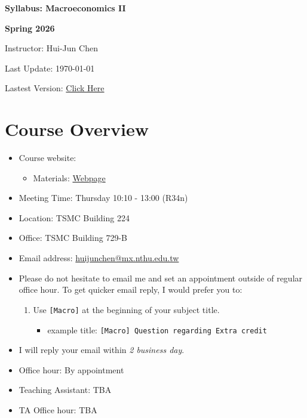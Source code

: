 \documentclass[12pt]{article}
\begin{document}
\centerline{\huge\bf Syllabus: Macroeconomics II}
\medskip
\centerline{\LARGE \bf Spring 2026}
\medskip
\centerline{\Large Instructor: Hui-Jun Chen}
\centerline{Last Update: \today}
\centerline{Lastest Version: \href{https://huijunchen9260.github.io/pdf/MacroeconomicsIISpring2026/syllabus/syllabus.pdf}{Click Here}}

\medskip



\section*{Course Overview}
\begin{itemize}

    \item Course website:
    \begin{itemize}

       \item Materials: \href{https://huijunchen9260.github.io/MacroeconomicsIISpring2026.html}{Webpage}
    \end{itemize}
    \item Meeting Time: Thursday 10:10 - 13:00 (R34n)
    \item Location: TSMC Building 224
    \item Office: TSMC Building 729-B
    \item Email address: \href{huijunchen@mx.nthu.edu.tw}{huijunchen@mx.nthu.edu.tw}
    \item Please do not hesitate to email me and set an appointment outside of regular office hour.
To get quicker email reply, I would prefer you to:
    \begin{enumerate}
        \item Use \texttt{[Macro]} at the beginning of your subject title.
\begin{itemize}
            \item example title: \texttt{[Macro] Question regarding Extra credit}
        \end{itemize}
    \end{enumerate}
    \item I will reply your email within \textit{2 business day}.
\item Office hour: By appointment
    \item Teaching Assistant: TBA
    \item TA Office hour: TBA
\end{itemize}
\end{document}
